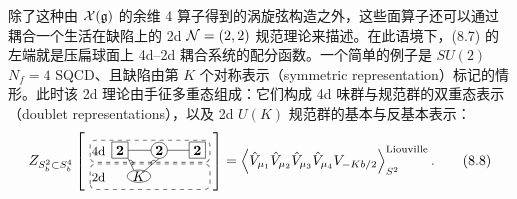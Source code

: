  除了这种由 $\mathcal{X}(\mathfrak{g})$ 的余维 4 算子得到的涡旋弦构造之外，这些面算子还可以通过耦合一个生活在缺陷上的 2d $\mathcal{N}=(2,2)$ 规范理论来描述。在此语境下，(8.7) 的左端就是压扁球面上 4d--2d 耦合系统的配分函数。一个简单的例子是 $SU(2)$ $N_f=4$ SQCD、且缺陷由第 $K$ 个对称表示（symmetric representation）标记的情形。此时该 2d 理论由手征多重态组成：它们构成 4d 味群与规范群的双重态表示（doublet representations），以及 2d $U(K)$ 规范群的基本与反基本表示：
\begin{equation}
    Z_{S^2_b\subset S^4_b}\left[\,
    \begin{tikzpicture}[scale=1.0,baseline=(current bounding box.center)]
      \draw[gray,dashed,thick,rounded corners=4pt] (0,0.70) rectangle (3.02,1.26);
      \draw[gray,dashed,thick,rounded corners=4pt] (0,0.015) rectangle (3.02,0.66);
      \node[font=\small] at (0.21,0.99) {4d};
      \node[font=\small] at (0.21,0.33) {2d};
      \draw (0.545,0.805) rectangle (0.955,1.215);
      \node at (0.75,1.005) {\textbf{2}};
      \draw (1.74,1.005) circle (0.205);
      \node at (1.74,1.005) {\textbf{2}};
      \draw (2.495,0.805) rectangle (2.905,1.215);
      \node at (2.70,1.005) {\textbf{2}};
      \draw (0.955,1.005) -- (1.535,1.005);
      \draw (1.945,1.005) -- (2.495,1.005);
      \draw (1.23,0.35) ellipse (0.295 and 0.155);
      \node at (1.23,0.35) {$K$};
      \draw (0.955,0.805) -- (1.10,0.50);
      \draw (1.74,0.80) -- (1.36,0.48);
      \draw (1.013,0.683) ++(-64.6:0.07) arc[start angle=-64.6, end angle=115.4, radius=0.07];
      \draw (1.603,0.683) ++(39.8:0.07) arc[start angle=39.8, end angle=219.8, radius=0.07];
    \end{tikzpicture}
    \,\right]
    =\left\langle\hat V_{\mu_1}\hat V_{\mu_2}\hat V_{\mu_3}\hat V_{\mu_4}V_{-Kb/2}\right\rangle^{\text{Liouville}}_{S^2}.
    \tag{8.8}
\end{equation}

